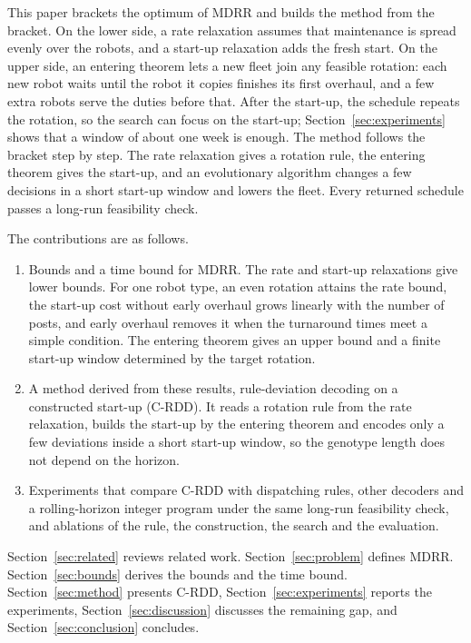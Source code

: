 This paper brackets the optimum of MDRR and builds the method from the bracket.
On the lower side, a rate relaxation assumes that maintenance is spread evenly over the robots, and a start-up relaxation adds the fresh start.
On the upper side, an entering theorem lets a new fleet join any feasible rotation: each new robot waits until the robot it copies finishes its first overhaul, and a few extra robots serve the duties before that.
After the start-up, the schedule repeats the rotation, so the search can focus on the start-up; Section~\ref{sec:experiments} shows that a window of about one week is enough.
The method follows the bracket step by step.
The rate relaxation gives a rotation rule, the entering theorem gives the start-up, and an evolutionary algorithm changes a few decisions in a short start-up window and lowers the fleet.
Every returned schedule passes a long-run feasibility check.

The contributions are as follows.
\begin{enumerate}
  \item Bounds and a time bound for MDRR.
  The rate and start-up relaxations give lower bounds.
  For one robot type, an even rotation attains the rate bound, the start-up cost without early overhaul grows linearly with the number of posts, and early overhaul removes it when the turnaround times meet a simple condition.
  The entering theorem gives an upper bound and a finite start-up window determined by the target rotation.
  \item A method derived from these results, rule-deviation decoding on a constructed start-up (C-RDD).
  It reads a rotation rule from the rate relaxation, builds the start-up by the entering theorem and encodes only a few deviations inside a short start-up window, so the genotype length does not depend on the horizon.
  \item Experiments that compare C-RDD with dispatching rules, other decoders and a rolling-horizon integer program under the same long-run feasibility check, and ablations of the rule, the construction, the search and the evaluation.
\end{enumerate}

Section~\ref{sec:related} reviews related work.
Section~\ref{sec:problem} defines MDRR.
Section~\ref{sec:bounds} derives the bounds and the time bound.
Section~\ref{sec:method} presents C-RDD, Section~\ref{sec:experiments} reports the experiments, Section~\ref{sec:discussion} discusses the remaining gap, and Section~\ref{sec:conclusion} concludes.
